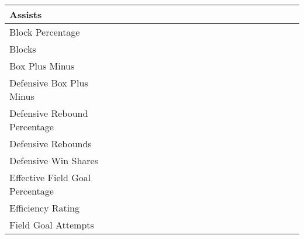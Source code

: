 \documentclass{article}
\def \cm{\checkmark}
\begin{document}
\begin{table}[ht]
\begin{tabular}{lccccccccccccccccccccc}
            \midrule
            Assists                             & \cm & \cm & \cm & \cm & \cm & \cm & \cm & \cm & \cm & \cm & \cm & \cm & \cm & \cm & \cm & \cm & \cm & \cm & \cm & \cm & \cm \\
            \midrule
            Block Percentage                    &     &     &     &     &     &     &     &     &     &     &     &     &     & \cm & \cm & \cm & \cm & \cm & \cm & \cm & \cm \\
            \midrule
            Blocks                              &     &     &     &     &     &     &     &     &     &     &     &     & \cm & \cm & \cm & \cm & \cm & \cm & \cm & \cm & \cm \\
            \midrule
            Box Plus Minus                      &     &     &     &     &     &     &     &     &     &     &     &     & \cm & \cm & \cm & \cm & \cm & \cm & \cm & \cm & \cm \\
            \midrule
            Defensive Box Plus Minus            &     &     &     &     &     &     &     &     &     &     &     &     & \cm & \cm & \cm & \cm & \cm & \cm & \cm & \cm & \cm \\
            \midrule
            Defensive Rebound Percentage        &     &     &     &     &     &     &     &     &     &     &     &     &     & \cm & \cm & \cm & \cm & \cm & \cm & \cm & \cm \\
            \midrule
            Defensive Rebounds                  &     &     &     &     &     &     &     &     &     &     &     &     & \cm & \cm & \cm & \cm & \cm & \cm & \cm & \cm & \cm \\
            \midrule
            Defensive Win Shares                &     &     & \cm & \cm & \cm & \cm & \cm & \cm & \cm & \cm & \cm & \cm & \cm & \cm & \cm & \cm & \cm & \cm & \cm & \cm & \cm \\
            \midrule
            Effective Field Goal Percentage     &     &     &     &     & \cm & \cm & \cm & \cm & \cm & \cm & \cm & \cm & \cm & \cm & \cm & \cm & \cm & \cm & \cm & \cm & \cm \\
            \midrule
            Efficiency Rating                   &     &     &     &     &     &     &     &     & \cm & \cm & \cm & \cm & \cm & \cm & \cm & \cm & \cm & \cm & \cm & \cm & \cm \\
            \midrule
            Field Goal Attempts                 & \cm & \cm & \cm & \cm & \cm & \cm & \cm & \cm & \cm & \cm & \cm & \cm & \cm & \cm & \cm & \cm & \cm & \cm & \cm & \cm & \cm \\

\end{tabular}
\end{table}
\end{document}

